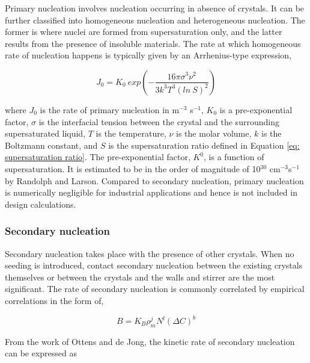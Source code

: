 Primary nucleation involves nucleation occurring in absence of crystals. \cite{seader_separation_2011} It can be further classified into homogeneous nucleation and heterogeneous nucleation. The former is where nuclei are formed from supersaturation only, and the latter results from the presence of insoluble materials. \cite{richardson_chemical_nodate} The rate at which homogeneous rate of nucleation happens is typically given by an Arrhenius-type expression, \cite{richardson_chemical_nodate}

\begin{equation}
     J_0 = K_0~exp(-\frac{16 \pi \sigma^3 \nu^2}{3 k^3 T^3 (ln~S)^2})
\end{equation}

\noindent where $J_0$ is the rate of primary nucleation in m$^{-3}$ s$^{-1}$, $K_0$ is a pre-exponential factor, $\sigma$ is the interfacial tension between the crystal and the surrounding supersaturated liquid, $T$ is the temperature, $\nu$ is the molar volume, $k$ is the Boltzmann constant, and $S$ is the supersaturation ratio defined in Equation \ref{eq: supersaturation ratio}. The pre-exponential factor, $K^0$, is a function of supersaturation. It is estimated to be in the order of magnitude of 10$^{30}$ cm$^{-3}$s$^{-1}$ by Randolph and Larson. \cite{randolph_theory_1971} Compared to secondary nucleation, primary nucleation is numerically negligible for industrial applications and hence is not included in design calculations. 

\subsubsection{Secondary nucleation}

Secondary nucleation takes place with the presence of other crystals. \cite{richardson_chemical_nodate} When no seeding is introduced, contact secondary nucleation between the existing crystals themselves or between the crystals and the walls and stirrer are the most significant. \cite{richardson_chemical_nodate} The rate of secondary nucleation is commonly correlated by empirical correlations in the form of,

\begin{equation} \label{eq:secondary nucleation general}
    B = K_B \rho^j_m N^l (\Delta C)^b 
\end{equation}

From the work of Ottens and de Jong, \cite{Ottens} the kinetic rate of secondary nucleation can be expressed as 

